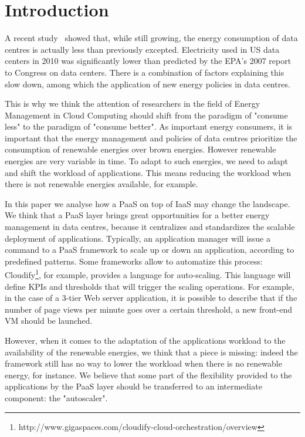 \section{Introduction}
\label{sec: intro}

A recent study~\cite{koomey2011} showed that, while still growing, the energy consumption of data centres is actually less than previously excepted.
Electricity used in US data centers in 2010 was significantly lower than predicted by the EPA’s 2007 report to Congress on data centers.
There is a combination of factors explaining this slow down, among which the application of new energy policies in data centres.

This is why we think the attention of researchers in the field of Energy Management in Cloud Computing should shift from the paradigm of "consume less" to the paradigm of "consume better".
As important energy consumers, it is important that the energy management and policies of data centres prioritize the consumption of renewable energies over brown energies.
However renewable energies are very variable in time.
To adapt to such energies, we need to adapt and shift the workload of applications.
This means reducing the workload when there is not renewable energies available, for example.

In this paper we analyse how a PaaS on top of IaaS may change the landscape.
We think that a PaaS layer brings great opportunities for a better energy management in data centres, because it centralizes and standardizes the scalable deployment of applications.
Typically, an application manager will issue a command to a PaaS framework to scale up or down an application, according to predefined patterns.
Some frameworks allow to automatize this process: Cloudify\footnote{http://www.gigaspaces.com/cloudify-cloud-orchestration/overview}, for example, provides a language for auto-scaling.
This language will define KPIs  and thresholds that will trigger the scaling operations.
For example, in the case of a 3-tier Web server application, it is possible to describe that if the number of page views per minute goes over a certain threshold, a new front-end VM should be launched.

However, when it comes to the adaptation of the applications workload to the availability of the renewable energies, we think that a piece is missing: indeed the framework still has no way to lower the workload when there is no renewable energy, for instance.
We believe that some part of the flexibility provided to the applications by the PaaS layer should be transferred to an intermediate component: the "autoscaler".

